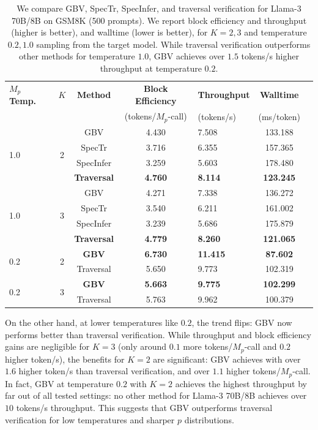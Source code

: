 \documentclass{article}
\theoremstyle{plain}
\theoremstyle{definition}
\theoremstyle{remark}
\begin{document}
\begin{table}[htbp]
\centering
\begin{tabular}{@{}lccclcc@{}}
\toprule
$M_p$ \textbf{Temp.} & $K$ & \textbf{Method} &
\textbf{Block Efficiency} & \textbf{Throughput} & \textbf{Walltime} \\
& & & (tokens/$M_p$-call) & (tokens/s) & (ms/token) \\
\midrule
\multirow{4}{*}{1.0}
& \multirow{4}{*}{2}
& GBV       & 4.430 &  7.508 & 133.188 \\
&& SpecTr    & 3.716 &  6.355 & 157.365 \\
&& SpecInfer & 3.259 &  5.603 & 178.480 \\
&& \textbf{Traversal} & \textbf{4.760} &  \textbf{8.114} & \textbf{123.245} \\
\midrule
\multirow{4}{*}{1.0}
& \multirow{4}{*}{3}
& GBV       & 4.271 &  7.338 & 136.272 \\
&& SpecTr    & 3.540 &  6.211 & 161.002 \\
&& SpecInfer & 3.239 &  5.686 & 175.879 \\
&& \textbf{Traversal} & \textbf{4.779 }&  \textbf{8.260} & \textbf{121.065} \\
\midrule
\multirow{2}{*}{0.2}
& \multirow{2}{*}{2}
& \textbf{GBV}    & \textbf{6.730}  & \textbf{11.415} & \textbf{87.602} \\
&& Traversal & 5.650 &  9.773 & 102.319  \\
\midrule
\multirow{2}{*}{0.2}
& \multirow{2}{*}{3}
& \textbf{GBV} & \textbf{5.663} &  \textbf{9.775} & \textbf{102.299 }\\
&& Traversal & 5.763  &  9.962  & 100.379  \\
\bottomrule
\end{tabular}
\caption{We compare GBV, SpecTr, SpecInfer, and traversal verification for Llama-3 70B/8B on GSM8K (500 prompts). We report block efficiency and throughput (higher is better), and walltime (lower is better), for $K=2,3$ and temperature $0.2,1.0$ sampling from the target model. While traversal verification outperforms other methods for temperature $1.0$, GBV achieves over $1.5$ tokens/s higher throughput at temperature $0.2$.}
\label{tab:method-comparison-gsm8k}
\end{table}


On the other hand, at lower temperatures like $0.2$, the trend flips: GBV now performs better than traversal verification. While throughput and block efficiency gains are negligible for $K=3$ (only around $0.1$ more tokens/$M_p$-call and $0.2$ higher token/s), the benefits for $K=2$ are significant: GBV achieves with over $1.6$ higher token/s than traversal verification, and over $1.1$ higher tokens/$M_p$-call. In fact, GBV at temperature $0.2$ with $K=2$ achieves the highest throughput by far out of all tested settings: no other method for Llama-3 70B/8B achieves over $10$ tokens/s throughput. This suggests that GBV outperforms traversal verification for low temperatures and sharper $p$ distributions.
\end{document}
